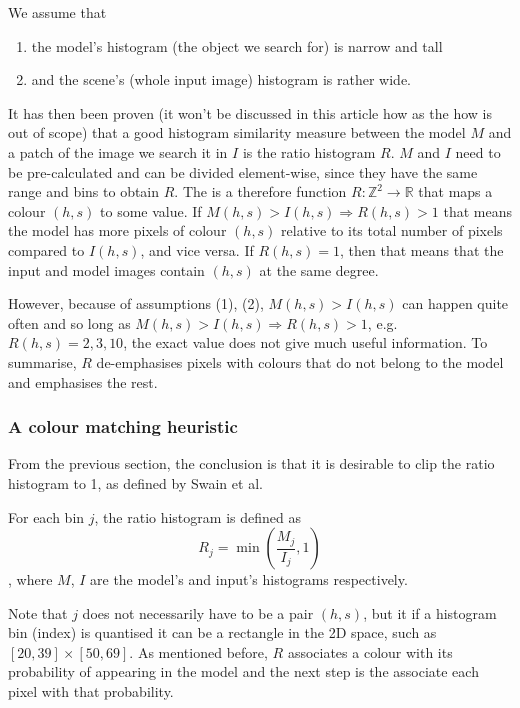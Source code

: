 \documentclass[a4paper]{article}
\begin{document}
We assume that 
\begin{enumerate}
    \item the model's histogram (the object we search for) is narrow and tall
    \item and the scene's (whole input image) histogram is rather wide.
\end{enumerate}
It has then been proven (it won't be discussed in this article how as the how is out of scope) that a good histogram similarity measure between the model $M$ and a patch of the image we search it in $I$ is the ratio histogram $R$. $M$ and $I$ need to be pre-calculated and can be divided element-wise, since they have the same range and bins to obtain $R$. The  is a therefore function $R:\mathbb{Z}^2 \rightarrow \mathbb{R}$ that maps a colour $(h,s)$ to some value. If $M(h,s) > I(h,s) \Rightarrow R(h,s) > 1$ that means the model has more pixels of colour $(h,s)$ relative to its total number of pixels compared to $I(h,s)$, and vice versa. If $R(h,s) = 1$, then that means  that the input and model images contain $(h,s)$ at the same degree.

However, because of assumptions (1), (2), $M(h,s) > I(h,s)$ can happen quite often and so long as $M(h,s) > I(h,s) \Rightarrow R(h,s)>1$, e.g. $R(h,s) = 2,3,10$, the exact value does not give much useful information. To summarise, $R$ de-emphasises pixels with colours that do not belong to the model and emphasises the rest.


\subsubsection{A colour matching heuristic}

From the previous section, the conclusion is that it is desirable to clip the ratio histogram to 1, as defined by Swain et al. 
\begin{definition}
For each bin $j$, the ratio histogram is defined as
\begin{equation}
    R_j = \min\left(\frac{M_j}{I_j},1\right)
\end{equation}
, where $M$, $I$ are the model's and input's histograms respectively.
\end{definition}
Note that $j$ does not necessarily have to be a pair $(h,s)$, but it if a histogram bin (index) is quantised it can be a rectangle in the 2D space, such as $[20, 39] \times [50, 69]$. As mentioned before, $R$ associates a colour with its probability of appearing in the model and the next step is the associate each pixel with that probability.
\end{document}
